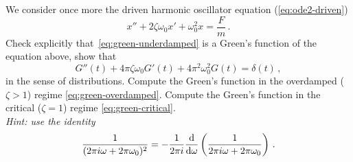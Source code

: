 \begin{ExerciseList}
  \Exercise[label=green] We consider once more the driven harmonic oscillator equation
  (\cf\cref{eq:ode2-driven})
  \begin{equation}
    x''+2\zeta\omega_0x'+\omega_0^2x=\frac{F}{m}\,.
  \end{equation}
  \Question Check explicitly that~\cref{eq:green-underdamped} is a Green's function of the
  equation above, \ie show that
  \begin{equation}
    G''(t)+4\pi\zeta\omega_0G'(t)+4\pi^2\omega_0^2G(t)=\delta(t)\,,
  \end{equation}
  in the sense of distributions.
  \Question Compute the Green's function in the overdamped ($\zeta>1$) regime \cref{eq:green-overdamped}.
  \Question Compute the Green's function in the critical ($\zeta=1$) regime \cref{eq:green-critical}.\\
  \emph{Hint: use the identity}
  \begin{equation}
    \frac{1}{(2\pi i\omega+2\pi\omega_0)^2}=-\frac{1}{2\pi i}
    \frac{\mathrm{d}}{\mathrm{d}\omega}\left(\frac{1}{2\pi i\omega+2\pi\omega_0}\right)\,.
  \end{equation}
  \pagebreak
\end{ExerciseList}
